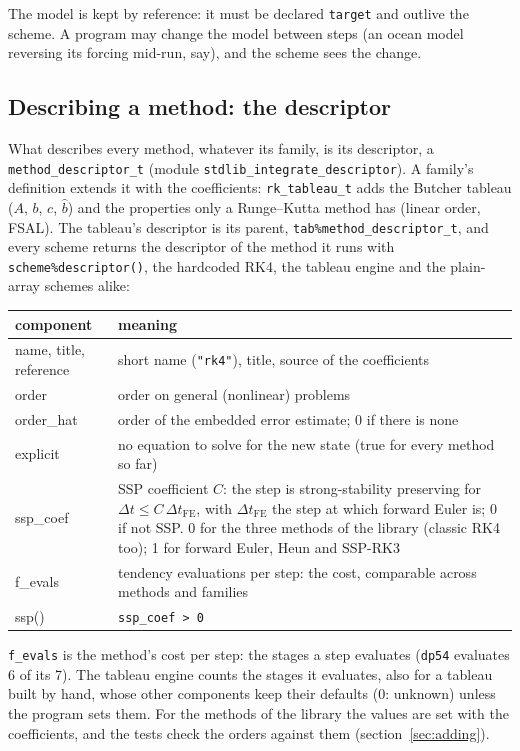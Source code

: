 \documentclass[11pt,a4paper]{article}
\newcommand{\dt}{\Delta t}
\newcommand{\code}[1]{\texttt{#1}}
\begin{document}
The model is kept by reference: it must be declared \code{target} and
outlive the scheme. A program may change the model between steps (an ocean
model reversing its forcing mid-run, say), and the scheme sees the change.

\subsection{Describing a method: the descriptor}
\label{sec:method}

What describes every method, whatever its family, is its descriptor, a
\code{method\_descriptor\_t} (module \code{stdlib\_integrate\_\allowbreak descriptor}).
A family's definition extends it with the coefficients: \code{rk\_tableau\_t}
adds the Butcher tableau ($A$, $b$, $c$, $\hat b$) and the properties only a
Runge--Kutta method has (linear order, FSAL). The tableau's
descriptor is its parent, \code{tab\%method\_descriptor\_t}, and every scheme
returns the descriptor of the method it runs with \code{scheme\%descriptor()},
the hardcoded RK4, the tableau engine and the plain-array schemes alike:
\begin{center}
\renewcommand{\arraystretch}{1.2}
\begin{tabular}{>{\ttfamily}l p{10.4cm}}
  \toprule
  \normalfont component & meaning \\
  \midrule
  name, title, reference & short name (\code{"rk4"}), title, source of the coefficients \\
  order       & order on general (nonlinear) problems \\
  order\_hat  & order of the embedded error estimate; 0 if there is none \\
  explicit    & no equation to solve for the new state (true for every method so far) \\
  ssp\_coef   & SSP coefficient $C$: the step is strong-stability preserving for
                $\dt \le C\,\dt_{\mathrm{FE}}$, with $\dt_{\mathrm{FE}}$ the step at which
                forward Euler is; 0 if not SSP. 0 for the three methods of the library
                (classic RK4 too); 1 for forward Euler, Heun and SSP-RK3 \\
  f\_evals    & tendency evaluations per step: the cost, comparable across methods
                and families \\
  ssp()       & \code{ssp\_coef > 0} \\
  \bottomrule
\end{tabular}
\end{center}
\code{f\_evals} is the method's cost per step: the stages a step evaluates
(\code{dp54} evaluates 6 of its 7). The tableau engine counts the stages it
evaluates, also for a tableau built by hand, whose other components keep
their defaults (0: unknown) unless the program sets them. For the methods of
the library the values are set with the coefficients, and the tests check
the orders against them (section~\ref{sec:adding}).
\end{document}
